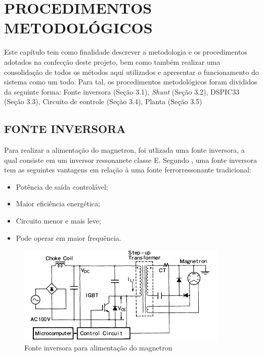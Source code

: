 \chapter{PROCEDIMENTOS METODOLÓGICOS}
\label{chap:metodologia}

Este capítulo tem como finalidade descrever a metodologia e os procedimentos adotados na confecção deste projeto, bem como também realizar uma consolidação de todos os métodos aqui utilizados e apresentar o funcionamento do sistema como um todo. Para tal, os procedimentos metodológicos foram divididos da seguinte forma: Fonte inversora (Seção 3.1),  \textit{Shunt} (Seção 3.2), DSPIC33  (Seção 3.3), Circuito de controle (Seção 3.4), Planta (Seção 3.5)

\section{FONTE INVERSORA}
\label{sec:fonteInversora}

Para realizar a alimentação do magnetron, foi utlizada uma fonte inversora, a qual consiste em um inversor ressonanete classe E. Segundo , uma fonte inversora tem as seguintes vantagens em relação à uma fonte ferrorressonante tradicional:
\begin{itemize}
    \item Potência de saída controlável;
    \item Maior eficiência energética;
    \item Circuito menor e mais leve;
    \item Pode operar em maior frequência.
\end{itemize} 

\begin{figure}[!htb]
    \centering
    \includegraphics[width=0.9\textwidth]{./dados/figuras/font_inverter}
    \caption{Fonte inversora para alimentação do magnetron}
    \label{fig:figura-inverter}
\end{figure}

